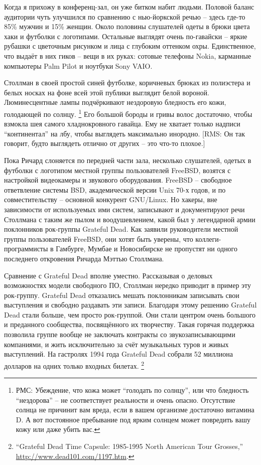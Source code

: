 Когда я прихожу в конференц-зал, он уже битком набит людьми. Половой баланс аудитории чуть улучшился по сравнению с нью-йоркской речью -- здесь где-то 85\% мужчин и 15\% женщин. Около половины слушателей одеты в брюки цвета хаки и футболки с логотипами. Остальные выглядят очень по-гавайски -- яркие рубашки с цветочным рисунком и лица с глубоким оттенком охры. Единственное, что выдаёт в них гиков -- вещи в их руках: сотовые телефоны Nokia, карманные компьютеры Palm Pilot и ноутбуки Sony VAIO.

Столлман в своей простой синей футболке, коричневых брюках из полиэстера и белых носках на фоне всей этой публики выглядит белой вороной. Люминесцентные лампы подчёркивают нездоровую бледность его кожи, голодающей по солнцу. \footnote{РМС: Убеждение, что кожа может \enquote{голодать по солнцу}, или что бледность \enquote{нездорова} -- не соответствует реальности и очень опасно. Отсутствие солнца не причинит вам вреда, если в вашем организме достаточно витамина D. А вот постоянное пребывание под ярким солнцем может повредить вашу кожу или даже убить вас.} Его большой бороды и гривы волос достаточно, чтобы взмокла шея самого хладнокровного гавайца. Ему не хватает только надписи \enquote{континентал} на лбу, чтобы выглядеть максимально инородно. [RMS: Он так говорит, будто выглядеть отлично от других -- это что-то плохое.]

Пока Ричард слоняется по передней части зала, несколько слушателей, одетых в футболки с логотипом местной группы пользователей FreeBSD, возятся с настройкой видеокамеры и звукового оборудования. FreeBSD -- свободное ответвление системы BSD, академической версии Unix 70-х годов, и по совместительству -- основной конкурент GNU/Linux. Но хакеры, вне зависимости от используемых ими систем, записывают и документируют речи Столлмана с таким же пылом и воодушевлением, какой был у легендарной армии поклонников рок-группы Grateful Dead. Как заявили руководители местной группы пользователей FreeBSD, они хотят быть уверены, что коллеги-программисты в Гамбурге, Мумбае и Новосибирске не пропустят ни одного последнего откровения Ричарда Мэттью Столлмана.

Сравнение с Grateful Dead вполне уместно. Рассказывая о деловых возможностях модели свободного ПО, Столлман нередко приводит в пример эту рок-группу. Grateful Dead отказались мешать поклонникам записывать свои выступления и свободно раздавать эти записи. Благодаря этому решению Grateful Dead стали больше, чем просто рок-группой. Они стали центром очень большого и преданного сообщества, посвящённого их творчеству. Такая горячая поддержка позволила группе вообще не заключать контракты со звукозаписывающими компаниями, и жить исключительно за счёт музыкальных туров и живых выступлений. На гастролях 1994 года Grateful Dead собрали 52 миллиона долларов на одних только входных билетах. \footnote{\enquote{Grateful Dead Time Capsule: 1985-1995 North American Tour Grosses,} \url{http://www.dead101.com/1197.htm}.}

